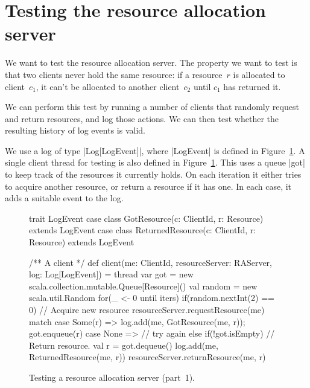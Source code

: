 \section{Testing the resource allocation server}

We want to test the resource allocation server.  The property we want to
test is that two clients never hold the same resource: if a resource~$r$ is
allocated to client~$c_1$, it can't be allocated to another client~$c_2$ until
$c_1$ has returned it.

We can perform this test by running a number of clients that randomly request
and return resources, and log those actions.  We can then test whether the
resulting history of log events is valid.



We use a log of type |Log[LogEvent]|, where |LogEvent| is defined in
Figure~\ref{fig:RATest-1}.  
%
A single client thread for testing is also defined in
Figure~\ref{fig:RATest-1}.   This uses a
queue |got| to keep track of the resources it currently holds.  On each
iteration it either tries to acquire another resource, or return a resource if
it has one.  In each case, it adds a suitable event to the log.

\begin{figure}
\begin{scala}
  trait LogEvent
  case class GotResource(c: ClientId, r: Resource) extends LogEvent
  case class ReturnedResource(c: ClientId, r: Resource) extends LogEvent

  /** A client */
  def client(me: ClientId, resourceServer: RAServer, log: Log[LogEvent]) = thread{
    var got = new scala.collection.mutable.Queue[Resource]()
    val random = new scala.util.Random
    for(_ <- 0 until iters){
      if(random.nextInt(2) == 0){ // Acquire new resource
	resourceServer.requestResource(me) match{
          case Some(r) =>  log.add(me, GotResource(me, r)); got.enqueue(r)
          case None => {}  // try again
        }
      }
      else if(!got.isEmpty){     // Return resource.
	val r = got.dequeue()
        log.add(me, ReturnedResource(me, r))
	resourceServer.returnResource(me, r)
      }
    }
  }
\end{scala}
\caption{Testing a resource allocation server (part~1).}
\label{fig:RATest-1}
\end{figure}

